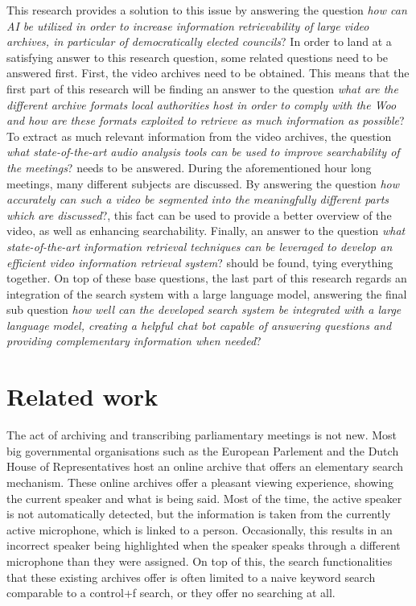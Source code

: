 \documentclass[twoside]{uva-inf-bachelor-thesis}
\begin{document}
This research provides a solution to this issue by answering the question \textit{how can AI be utilized in order to increase information retrievability of large video archives, in particular of democratically elected councils}? In order to land at a satisfying answer to this research question, some related questions need to be answered first. 
First, the video archives need to be obtained. This means that the first part of this research will be finding an answer to the question \textit{what are the different archive formats local authorities host in order to comply with the Woo and how are these formats exploited to retrieve as much information as possible}?
To extract as much relevant information from the video archives, the question \textit{what state-of-the-art audio analysis tools can be used to improve searchability of the meetings}? needs to be answered. During the aforementioned hour long meetings, many different subjects are discussed. By answering the question \textit{how accurately can such a video be segmented into the meaningfully different parts which are discussed}?, this fact can be used to provide a better overview of the video, as well as enhancing searchability. Finally, an answer to the question \textit{what state-of-the-art information retrieval techniques can be leveraged to develop an efficient video information retrieval system}? should be found, tying everything together.
On top of these base questions, the last part of this research regards an integration of the search system with a large language model, answering the final sub question \textit{how well can the developed search system be integrated with a large language model, creating a helpful chat bot capable of answering questions and providing complementary information when needed}?

\chapter{Related work}
The act of archiving and transcribing parliamentary meetings is not new. Most big governmental organisations such as the European Parlement and the Dutch House of Representatives host an online archive that offers an elementary search mechanism. 
These online archives offer a pleasant viewing experience, showing the current speaker and what is being said. Most of the time, the active speaker is not automatically detected, but the information is taken from the currently active microphone, which is linked to a person. Occasionally, this results in an incorrect speaker being highlighted when the speaker speaks through a different microphone than they were assigned.
On top of this, the search functionalities that these existing archives offer is often limited to a naive keyword search comparable to a control+f search, or they offer no searching at all.
\end{document}

